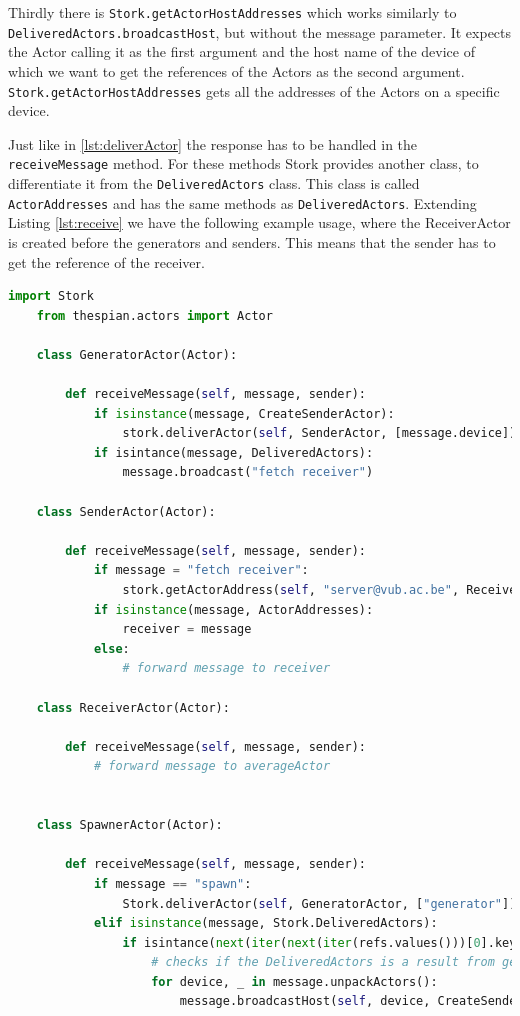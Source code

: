 \documentclass[a4paper]{article}
\begin{document}
Thirdly there is \lstinline|Stork.getActorHostAddresses| which works similarly to \lstinline|DeliveredActors.broadcastHost|, but without the message parameter. It expects the Actor calling it as the first argument and the host name of the device of which we want to get the references of the Actors as the second argument. \lstinline|Stork.getActorHostAddresses| gets all the addresses of the Actors on a specific device.

Just like in \ref{lst:deliverActor} the response has to be handled in the \lstinline{receiveMessage} method. For these methods Stork provides another class, to differentiate it from the \lstinline|DeliveredActors| class. This class is called \lstinline|ActorAddresses| and has the same methods as \lstinline|DeliveredActors|.
Extending Listing \ref{lst:receive} we have the following example usage, where the ReceiverActor is created before the generators and senders. This means that the sender has to get the reference of the receiver.
\begin{lstlisting}[language=Python, caption=Fetching an actor address, label=lst:fetch]
    import Stork
    from thespian.actors import Actor
    
    class GeneratorActor(Actor):
    
        def receiveMessage(self, message, sender):
            if isinstance(message, CreateSenderActor):
                stork.deliverActor(self, SenderActor, [message.device])
            if isintance(message, DeliveredActors):
                message.broadcast("fetch receiver")
    
    class SenderActor(Actor):
    
        def receiveMessage(self, message, sender):
            if message = "fetch receiver":
                stork.getActorAddress(self, "server@vub.ac.be", ReceiverActor)
            if isinstance(message, ActorAddresses):
                receiver = message
            else: 
                # forward message to receiver

    class ReceiverActor(Actor):
        
        def receiveMessage(self, message, sender):
            # forward message to averageActor

    
    class SpawnerActor(Actor):
    
        def receiveMessage(self, message, sender):
            if message == "spawn":
                Stork.deliverActor(self, GeneratorActor, ["generator"])
            elif isinstance(message, Stork.DeliveredActors):
                if isintance(next(iter(next(iter(refs.values()))[0].keys())), GeneratorActor):
                    # checks if the DeliveredActors is a result from generating the generators
                    for device, _ in message.unpackActors():
                        message.broadcastHost(self, device, CreateSenderActor(device))
                        
    \end{lstlisting}
\end{document}
